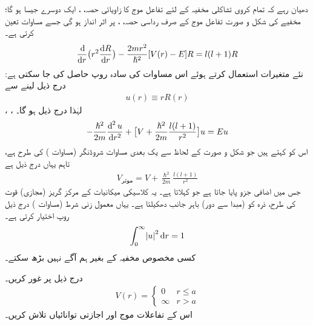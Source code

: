 دھیان رہے کہ تمام کروی تشاکلی  مخفیہ کے لئے تفاعل موج کا زاویائی حصہ، ،  ایک  دوسرے جیسا ہو گا؛ مخفیے    کی شکل و صورت تفاعل موج کے صرف رداسی حصہ، ، پر اثر انداز ہو گی جسے مساوات  تعین کرتی ہے۔
\begin{align}
\frac{\dif}{\dif r}\big(r^{2}\frac{\dif R}{\dif r}\big)-\frac{2mr^{2}}{\hslash^{2}}[V(r)-E]R=l(l+1)R
\end{align}
نئے متغیرات استعمال کرتے ہوئے اس مساوات کی سادہ روپ حاصل کی جا سکتی ہے: درج ذیل لینے سے
\begin{align}\label{مساوات_ابعادی_نئے_متغیر_رداسی}
u(r)\equiv{rR(r)} 
\end{align}  
، ،   لہٰذا درج ذیل ہو گا۔
\begin{align}\label{مساوات_ابعادی_رداسی}
-\frac{\hslash^{2}}{2m}\frac{\dif^{\,2}u}{\dif r^{2}}+\big[V+\frac{\hslash^{2}}{2m}\frac{l(l+1)}{r^{2}}\big]u=Eu
\end{align}
اس کو  کہتے ہیں جو شکل و صورت کے لحاظ سے یک بعدی مساوات شروڈنگر (مساوات ) کی طرح ہے، تاہم یہاں  درج ذیل ہے
\begin{align}
V_{\text{موثر}}=V+\frac{\hslash^{2}}{2m}\frac{l(l+1)}{r^{2}} 
\end{align}
 جس میں   اضافی جزو پایا جاتا ہے جو  کہلاتا ہے۔ یہ کلاسیکی میکانیات کے مرکز گریز (مجازی) قوت کی طرح، ذرہ کو (مبدا سے دور) باہر جانب دھکیلتا ہے۔ یہاں معمول زنی شرط (مساوات ) درج ذیل روپ اختیار کرتی ہے۔ 
\begin{align}
\int_{0}^{\infty}\abs{u}^{2}\dif r=1 
\end{align}
کسی مخصوص مخفیہ    کے بغیر ہم آگے نہیں بڑھ سکتے۔

درج ذیل     پر غور کریں۔
\begin{align}
V(r)=\begin{cases}
0&r\le {a}\\
\infty&r>a
\end{cases} 
\end{align}
اس کے تفاعلات موج اور اجازتی توانائیاں تلاش کریں۔

